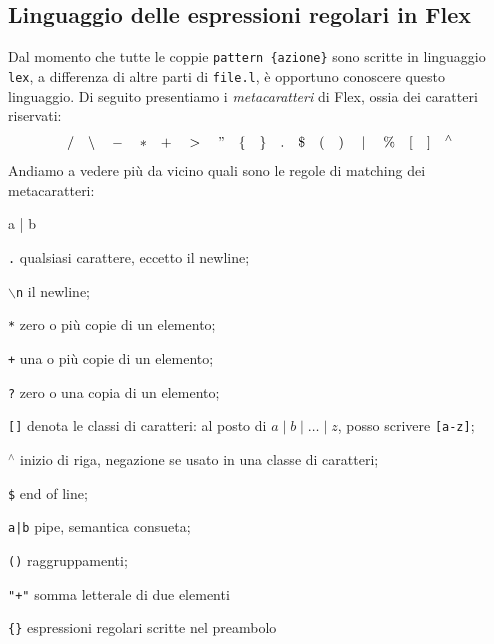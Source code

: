 \documentclass[class=book, crop=false, oneside, 12pt]{standalone}
\begin{document}
\subsection{Linguaggio delle espressioni regolari in Flex}
Dal momento che tutte le coppie \texttt{pattern \{azione\}} sono scritte in linguaggio \texttt{lex}, a differenza di altre parti di \texttt{file.l}, è opportuno conoscere questo linguaggio. Di seguito presentiamo i \emph{metacaratteri} di Flex, ossia dei caratteri riservati:
\begin{equation*}
    \slash \quad \backslash \quad - \quad * \quad + \quad >\quad " \quad \{ \quad \} \quad . \quad \$ \quad ( \quad ) \quad \mid \quad \% \quad [ \quad ] \quad ^\wedge
\end{equation*}
\noindent Andiamo a vedere più da vicino quali sono le regole di matching dei metacaratteri:
\begin{labeling}{a | b}
    \item[\texttt{.}] qualsiasi carattere, eccetto il newline;
    \item[\texttt{\(\backslash\)n}] il newline;
    \item[\texttt{*}] zero o più copie di un elemento;
    \item[\texttt{+}] una o più copie di un elemento;
    \item[\texttt{?}] zero o una copia di un elemento;
    \item[\texttt{[]}] denota le classi di caratteri: al posto di \(a \mid b \mid \ldots \mid z\), posso scrivere \texttt{[a-z]};
    \item[\texttt{\(^\wedge\)}] inizio di riga, negazione se usato in una classe di caratteri;
    \item[\texttt{\$}] end of line;
    \item[\texttt{a|b}] pipe, semantica consueta;
    \item[\texttt{()}] raggruppamenti;
    \item[\texttt{"+"}] somma letterale di due elementi
    \item[\texttt{\{\}}] espressioni regolari scritte nel preambolo
\end{labeling}
\end{document}
